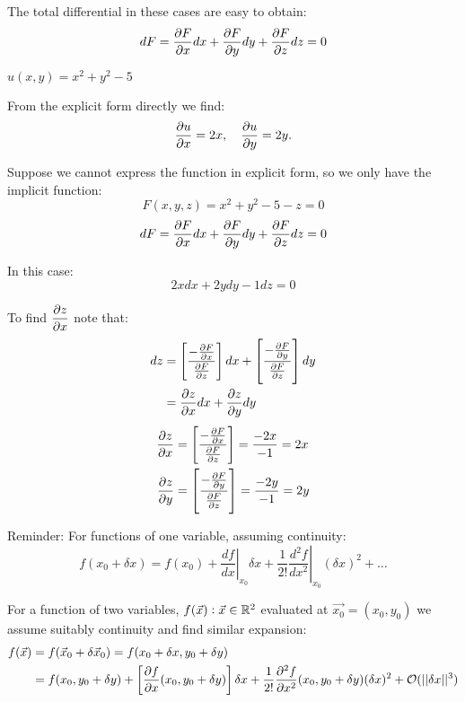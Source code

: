 \documentclass[10pt]{scrartcl}
\begin{document}
The total differential in these cases are easy to obtain:
\[dF = \frac{\partial F}{\partial x}dx + \frac{\partial F}{\partial y}dy + \frac{\partial F}{\partial z}dz = 0\]
\begin{example}
$u(x,y) = x^2 + y^2 - 5$

From the explicit form directly we find:
\[\frac{\partial u}{\partial x} = 2x, \quad \frac{\partial u}{\partial y} = 2y.\]	

Suppose we cannot express the function in explicit form, so we only have the implicit function:
\[F(x,y,z) = x^2 + y^2 -5 - z = 0\]
\[dF = \frac{\partial F}{\partial x}dx + \frac{\partial F}{\partial y}dy + \frac{\partial F}{\partial z}dz = 0\]

In this case: 
\[2xdx + 2ydy -1dz = 0\]

To find $\dfrac{\partial z}{\partial x}$ note that:
\[
\begin{aligned}
  dz &= \left[\frac{-\frac{\partial F}{\partial x}}{\frac{\partial F}{\partial z}}\right]dx
  + 
  \left[\frac{-\frac{\partial F}{\partial y}}{\frac{\partial F}{\partial z}}\right]dy\\
  &= \frac{\partial z}{\partial x}dx + \frac{\partial z}{\partial y}dy
\end{aligned}
\]
\[
\begin{aligned}
  \frac{\partial z}{\partial x} &= \left[\frac{-\frac{\partial F}{\partial x}}{\frac{\partial F}{\partial z}}\right] = \frac{-2x}{-1} = 2x\\
  \frac{\partial z}{\partial y} &=  \left[\frac{-\frac{\partial F}{\partial y}}{\frac{\partial F}{\partial z}}\right] = \frac{-2y}{-1} = 2y
\end{aligned}
\]
\end{example}



Reminder: 
 For functions of one variable, assuming continuity: 
\[f(x_0 + \delta x) = f(x_0) + \left.\frac{df}{dx}\right|_{x_0}\delta x + \frac{1}{2!}\left.\frac{d^2f}{dx^2}\right|_{x_0}(\delta x)^2 + \dots\]

For a function of two variables, $f(\vec{x}): \vec{x} \in\mathbb{R}^2$ evaluated at $\vec{x_0} = (x_0,y_0)$ we assume suitably continuity and find similar expansion: 
\[
\begin{aligned}
  f(\vec{x}) &= f(\vec{x}_0 + \delta\vec{x}_0) = f(x_0+\delta x, y_0 + \delta y) \\
  &= f(x_0, y_0 + \delta y) + \left[\frac{\partial f}{\partial x}(x_0,y_0 + \delta y)\right]\delta x + \frac{1}{2!}\frac{\partial^2f}{\partial x^2}(x_0,y_0+\delta y)(\delta x)^2 + \mathcal{O}(||\delta x||^3)\\
\end{aligned}
\]
\end{document}
